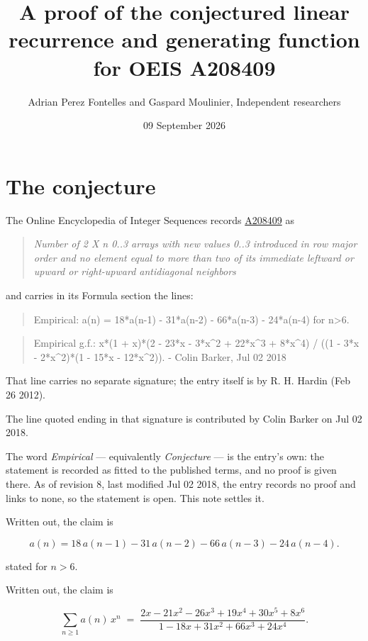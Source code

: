 \documentclass[11pt]{article}
\title{A proof of the conjectured linear recurrence and generating function for OEIS A208409}
\author{Adrian Perez Fontelles and Gaspard Moulinier, Independent researchers}
\date{09 September 2026}
\theoremstyle{definition}
\begin{document}
\maketitle
\section{The conjecture}

The Online Encyclopedia of Integer Sequences records \href{https://oeis.org/A208409}{A208409} as

\begin{quote}\itshape Number of 2 X n 0..3 arrays with new values 0..3 introduced in row major order and no element equal to more than two of its immediate leftward or upward or right-upward antidiagonal neighbors\end{quote}

and carries in its Formula section the lines:

\begin{quote}\ttfamily Empirical: a(n) = 18*a(n-1) - 31*a(n-2) - 66*a(n-3) - 24*a(n-4) for n>6.\end{quote}

\begin{quote}\ttfamily Empirical g.f.: x*(1 + x)*(2 - 23*x - 3*x\textasciicircum{}2 + 22*x\textasciicircum{}3 + 8*x\textasciicircum{}4) / ((1 - 3*x - 2*x\textasciicircum{}2)*(1 - 15*x - 12*x\textasciicircum{}2)). - Colin Barker, Jul 02 2018\end{quote}

That line carries no separate signature; the entry itself is by R. H. Hardin (Feb 26 2012).

The line quoted ending in that signature is contributed by Colin Barker on Jul 02 2018.

The word {\itshape Empirical} --- equivalently {\itshape Conjecture} --- is the entry's own: the statement is recorded as fitted to the published terms, and no proof is given there. As of revision 8, last modified Jul 02 2018, the entry records no proof and links to none, so the statement is open. This note settles it.

Written out, the claim is

\[a(n) = 18\,a(n-1) - 31\,a(n-2) - 66\,a(n-3) - 24\,a(n-4).\]

stated for $n > 6$.

Written out, the claim is

\[\sum_{n \ge 1} a(n)\,x^n \;=\; \frac{2x - 21x^{2} - 26x^{3} + 19x^{4} + 30x^{5} + 8x^{6}}{1 - 18x + 31x^{2} + 66x^{3} + 24x^{4}}.\]
\end{document}
